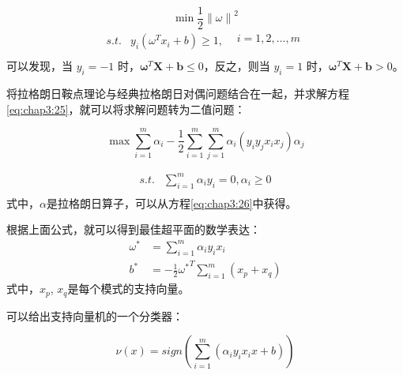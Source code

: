 \begin{equation}
\min \frac{1}{2}{\left\| {\left. \omega  \right\|} \right.^2}
\label{eq:chap3:25}
\end{equation}
\begin{equation*}
\begin{array}{*{20}{c}}
   {s.t.} & {{y_i}\left( {{\omega ^T}{x_i} + b} \right) \ge 1,\begin{array}{*{20}{c}}
   {} & {i = 1,2,...,m}  \\
\end{array}}  \\
\end{array}
\end{equation*}
可以发现，当 $y_i=-1$ 时，$\bm{\omega}^T\bm{X}+\bm{b} \leq 0$，反之，则当 $y_i=1$ 时，$\bm{\omega}^T\bm{X}+\bm{b} > 0$。

将拉格朗日鞍点理论与经典拉格朗日对偶问题结合在一起，并求解方程\ref{eq:chap3:25}，就可以将求解问题转为二值问题：

\begin{equation}
\max \sum\limits_{i = 1}^m {{\alpha _i} - \frac{1}{2}\sum\limits_{i = 1}^m {\sum\limits_{j = 1}^m {{\alpha _i}\left( {{y_i}{y_j}{x_i}{x_j}} \right)} {\alpha _j}} }
\label{eq:chap3:26}
\end{equation}

\begin{equation*}
\begin{array}{*{20}{c}}
   {s.t.} & {\sum\limits_{i = 1}^m {{\alpha _i}{y_i} = 0,{\alpha _i} \ge 0} }  \\
\end{array}
\end{equation*}
式中，$\alpha$是拉格朗日算子，可以从方程\ref{eq:chap3:26}中获得。

根据上面公式，就可以得到最佳超平面的数学表达：
\begin{align}
  {\omega ^*} &= \sum\limits_{i = 1}^m {{\alpha _i}{y_i}{x_i}}
  \label{eq:chap3:27}\\
  {b^*} &=  - \frac{1}{2}{\omega ^*}^T\sum\limits_{i = 1}^m {\left( {{x_p} + {x_q}} \right)}
  \label{eq:chap3:28}
\end{align}
式中，$x_p$, $x_q$是每个模式的支持向量。

可以给出支持向量机的一个分类器：

\begin{equation}
\nu \left( x \right) = sign\left( {\sum\limits_{i = 1}^m {\left( {{\alpha _i}{y_i}{x_i}x + b} \right)} } \right)
\label{eq:chap3:29}
\end{equation}


